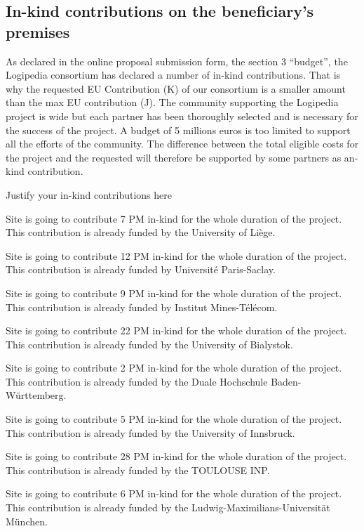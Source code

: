 
\subsection*{In-kind contributions on the beneficiary’s premises}

As declared in the online proposal submission form, the section 3
``budget'', the Logipedia consortium has declared a number of in-kind
contributions. That is why the requested EU Contribution (K) of our
consortium is a smaller amount than the max EU contribution (J). The
community supporting the Logipedia project is wide but each partner
has been thoroughly selected and is necessary for the success of the
project. A budget of 5 millions euros is too limited to support all
the efforts of the community. The difference between the total
eligible costs for the project and the requested will therefore be
supported by some partners as an-kind contribution.

{\color{red} Justify your in-kind contributions here}

Site  is going to contribute 7 PM in-kind for the whole duration of the project.
This contribution is already funded by the University of Liège.

Site  is going to contribute 12 PM in-kind for the whole duration of the project.
This contribution is already funded by Université Paris-Saclay.

Site  is going to contribute 9 PM in-kind for the whole duration of the project.
This contribution is already funded by Institut Mines-Télécom.

Site  is going to contribute 22 PM in-kind for the whole duration of the project.
This contribution is already funded by the University of Bialystok.

Site  is going to contribute 2 PM in-kind for the whole duration of the project.
This contribution is already funded by the Duale Hochschule Baden-Württemberg.

Site  is going to contribute 5 PM in-kind for the whole duration of the project.
This contribution is already funded by the University of Innsbruck.

Site  is going to contribute 28 PM in-kind for the whole duration of the project.
This contribution is already funded by the TOULOUSE INP.

Site  is going to contribute 6 PM in-kind for the whole duration of the project.
This contribution is already funded by the Ludwig-Maximilians-Universit\"at M\"unchen.


